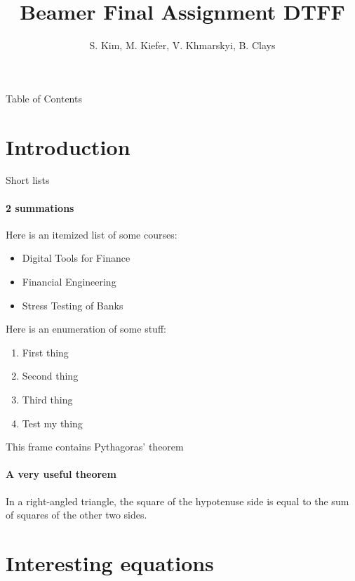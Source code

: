 \documentclass{beamer}
\title{Beamer Final Assignment DTFF}
\author{S. Kim, M. Kiefer, V. Khmarskyi, B. Clays}
\institute{University of Zürich,}
\begin{document}
\begin{frame}
\titlepage
\end{frame}

\begin{frame}{Table of Contents}
\tableofcontents
\end{frame}

\section{Introduction}

\begin{frame}{Short lists}
\framesubtitle{2 summations}

Here is an itemized list of some courses:
\begin{itemize}
    \item Digital Tools for Finance
    \item Financial Engineering
    \item Stress Testing of Banks
\end{itemize}

\bigbreak

Here is an enumeration of some stuff:
\begin{enumerate}
    \item First thing
    \item Second thing
    \item Third thing
    \item Test my thing
\end{enumerate}

\end{frame}

\begin{frame}{This frame contains Pythagoras' theorem}
\framesubtitle{A very useful theorem}

\begin{theorem}
In a right-angled triangle, the square of the hypotenuse side is equal to the sum of squares of the other two sides.
\end{theorem}

\end{frame}

\section{Interesting equations}
\end{document}

